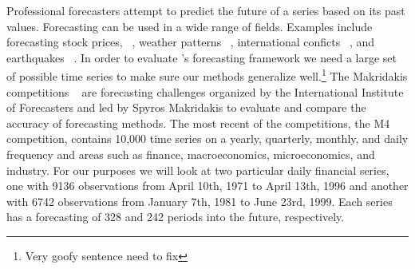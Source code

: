 \documentclass[article]{jss}\usepackage[]{graphicx}\usepackage[]{color}
\begin{document}
Professional forecasters attempt to predict the future of a series based on its past values. Forecasting can be used in a wide range of fields. Examples include forecasting stock prices, ~\cite{GRANGER19923}, weather patterns ~\cite{MurphymeteoForecast}, international conficts ~\cite{Chadefaux01012014}, and earthquakes ~\cite{earthquakeYegu}. In order to evaluate 's forecasting framework we need a large set of possible time series to make sure our methods generalize well.\footnote{Very goofy sentence need to fix}
The Makridakis competitions ~\cite{Makridakis2000451} are forecasting challenges organized by the International Institute of Forecasters and led by Spyros Makridakis to evaluate and compare the accuracy of forecasting methods. The most recent of the competitions, the M4 competition, contains 10,000 time series on a yearly, quarterly, monthly, and daily frequency and areas such as finance, macroeconomics, microeconomics, and industry. For our purposes we will look at two particular daily financial series, one with 9136 observations from April 10th, 1971 to April 13th, 1996 and another with 6742 observations from January 7th, 1981 to June 23rd, 1999. Each series has a forecasting of 328 and 242 periods into the future, respectively.
\end{document}
